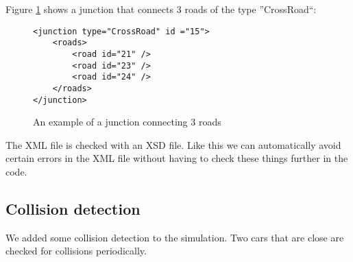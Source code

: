 Figure \ref{fig:xmlJunction} shows a junction that connects 3 roads of the type 
''CrossRoad``:

\begin{figure}[H]
\begin{lstlisting}
<junction type="CrossRoad" id ="15">
	<roads>
		<road id="21" />
		<road id="23" />
		<road id="24" />
	</roads>
</junction>
\end{lstlisting}
\caption{An example of a junction connecting 3 roads}
\label{fig:xmlJunction}
\end{figure}

The XML file is checked with an XSD file. Like this we can automatically
avoid certain errors in the XML file without having to check these
things further in the code.

\subsection{Collision detection}

We added some collision detection to the simulation. Two cars
that are close are checked for collisions periodically.

